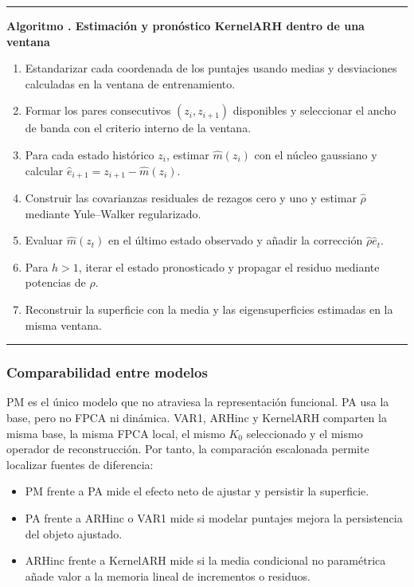 \documentclass[a4paper,11pt]{article}
\newcounter{algoritmotesis}
\newenvironment{algoritmotesis}[1]{%
  \refstepcounter{algoritmotesis}%
  \par\medskip
  \noindent\begin{minipage}{\linewidth}
  \hrule\vspace{0.6em}
  \textbf{Algoritmo \thealgoritmotesis. #1}
  \begin{enumerate}
}{%
  \end{enumerate}
  \vspace{0.2em}\hrule
  \end{minipage}
  \par\medskip
}
\begin{document}
\begin{algoritmotesis}{Estimación y pronóstico KernelARH dentro de una ventana}
  \item Estandarizar cada coordenada de los puntajes usando medias y desviaciones calculadas en la ventana de entrenamiento.
  \item Formar los pares consecutivos \((z_i,z_{i+1})\) disponibles y seleccionar el ancho de banda con el criterio interno de la ventana.
  \item Para cada estado histórico \(z_i\), estimar \(\widehat m(z_i)\) con el núcleo gaussiano y calcular \(\widehat e_{i+1}=z_{i+1}-\widehat m(z_i)\).
  \item Construir las covarianzas residuales de rezagos cero y uno y estimar \(\widehat\rho\) mediante Yule--Walker regularizado.
  \item Evaluar \(\widehat m(z_t)\) en el último estado observado y añadir la corrección \(\widehat\rho\widehat e_t\).
  \item Para \(h>1\), iterar el estado pronosticado y propagar el residuo mediante potencias de \(\widehat\rho\).
  \item Reconstruir la superficie con la media y las eigensuperficies estimadas en la misma ventana.
\end{algoritmotesis}

\subsubsection{Comparabilidad entre modelos}

PM es el único modelo que no atraviesa la representación funcional. PA usa la base, pero no FPCA ni dinámica. VAR1, ARHinc y KernelARH comparten la misma base, la misma FPCA local, el mismo \(K_0\) seleccionado y el mismo operador de reconstrucción. Por tanto, la comparación escalonada permite localizar fuentes de diferencia:
\begin{itemize}
  \item PM frente a PA mide el efecto neto de ajustar y persistir la superficie.
  \item PA frente a ARHinc o VAR1 mide si modelar puntajes mejora la persistencia del objeto ajustado.
  \item ARHinc frente a KernelARH mide si la media condicional no paramétrica añade valor a la memoria lineal de incrementos o residuos.
\end{itemize}
\end{document}
